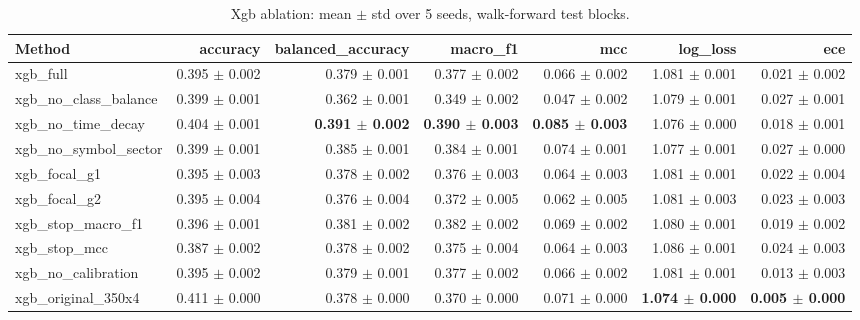 \begin{table}[t]
\centering
\scriptsize
\caption{Xgb ablation: mean $\pm$ std over 5 seeds, walk-forward test blocks.}
\label{tab:xgb_ablation}
\begin{tabular}{lrrrrrr}
\toprule
Method & accuracy & balanced\_accuracy & macro\_f1 & mcc & log\_loss & ece \\
\midrule
xgb\_full & 0.395 $\pm$ 0.002 & 0.379 $\pm$ 0.001 & 0.377 $\pm$ 0.002 & 0.066 $\pm$ 0.002 & 1.081 $\pm$ 0.001 & 0.021 $\pm$ 0.002 \\
xgb\_no\_class\_balance & 0.399 $\pm$ 0.001 & 0.362 $\pm$ 0.001 & 0.349 $\pm$ 0.002 & 0.047 $\pm$ 0.002 & 1.079 $\pm$ 0.001 & 0.027 $\pm$ 0.001 \\
xgb\_no\_time\_decay & 0.404 $\pm$ 0.001 & \textbf{0.391 $\pm$ 0.002} & \textbf{0.390 $\pm$ 0.003} & \textbf{0.085 $\pm$ 0.003} & 1.076 $\pm$ 0.000 & 0.018 $\pm$ 0.001 \\
xgb\_no\_symbol\_sector & 0.399 $\pm$ 0.001 & 0.385 $\pm$ 0.001 & 0.384 $\pm$ 0.001 & 0.074 $\pm$ 0.001 & 1.077 $\pm$ 0.001 & 0.027 $\pm$ 0.000 \\
xgb\_focal\_g1 & 0.395 $\pm$ 0.003 & 0.378 $\pm$ 0.002 & 0.376 $\pm$ 0.003 & 0.064 $\pm$ 0.003 & 1.081 $\pm$ 0.001 & 0.022 $\pm$ 0.004 \\
xgb\_focal\_g2 & 0.395 $\pm$ 0.004 & 0.376 $\pm$ 0.004 & 0.372 $\pm$ 0.005 & 0.062 $\pm$ 0.005 & 1.081 $\pm$ 0.003 & 0.023 $\pm$ 0.003 \\
xgb\_stop\_macro\_f1 & 0.396 $\pm$ 0.001 & 0.381 $\pm$ 0.002 & 0.382 $\pm$ 0.002 & 0.069 $\pm$ 0.002 & 1.080 $\pm$ 0.001 & 0.019 $\pm$ 0.002 \\
xgb\_stop\_mcc & 0.387 $\pm$ 0.002 & 0.378 $\pm$ 0.002 & 0.375 $\pm$ 0.004 & 0.064 $\pm$ 0.003 & 1.086 $\pm$ 0.001 & 0.024 $\pm$ 0.003 \\
xgb\_no\_calibration & 0.395 $\pm$ 0.002 & 0.379 $\pm$ 0.001 & 0.377 $\pm$ 0.002 & 0.066 $\pm$ 0.002 & 1.081 $\pm$ 0.001 & 0.013 $\pm$ 0.003 \\
xgb\_original\_350x4 & 0.411 $\pm$ 0.000 & 0.378 $\pm$ 0.000 & 0.370 $\pm$ 0.000 & 0.071 $\pm$ 0.000 & \textbf{1.074 $\pm$ 0.000} & \textbf{0.005 $\pm$ 0.000} \\
\bottomrule
\end{tabular}
\end{table}
